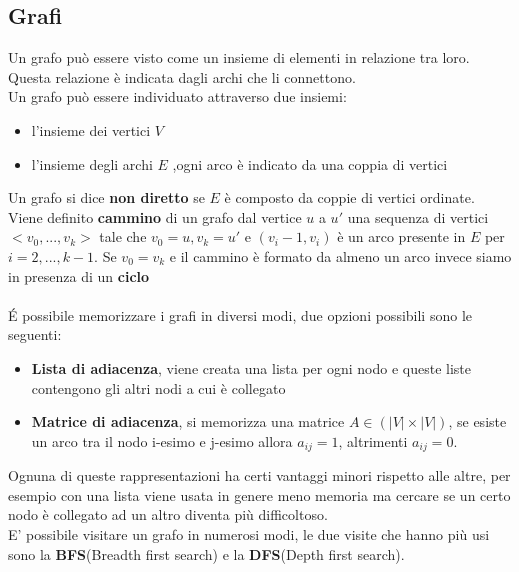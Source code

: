 \documentclass[]{article}
\begin{document}
\subsection{Grafi}
Un grafo può essere visto come un insieme di elementi in relazione tra loro.\\
Questa relazione è indicata dagli archi che li connettono.\\
Un grafo può essere individuato attraverso due insiemi:
\begin{itemize}
\item l'insieme dei vertici $V$
\item l'insieme degli archi $E$ ,ogni arco è indicato da una coppia di vertici
\end{itemize}
Un grafo si dice \textbf{non diretto} se $E$ è composto da coppie di vertici ordinate.\\
Viene definito \textbf{cammino} di un grafo dal vertice $u$ a $u'$ una sequenza di vertici $<v_0, ... , v_k>$ tale che $v_0 = u,v_k=u'$ e $(v_i-1, v_i)$ è un arco presente in $E$ per $i = 2,..., k-1$. Se $v_0 = v_k$ e il cammino è formato da almeno un arco invece siamo in presenza di un \textbf{ciclo}
\\\\
\'E possibile memorizzare i grafi in diversi modi, due opzioni possibili sono le seguenti:
\begin{itemize}
\item \textbf{Lista di adiacenza}, viene creata una lista per ogni nodo e queste liste contengono gli altri nodi a cui è collegato
\item \textbf{Matrice di adiacenza}, si memorizza una matrice $A \in (|V| \times |V|)$, se esiste un arco tra il nodo i-esimo e j-esimo allora $a_{ij} = 1$, altrimenti $a_{ij} = 0$. 
\end{itemize}
Ognuna di queste rappresentazioni ha certi vantaggi minori rispetto alle altre, per esempio con una lista viene usata in genere meno memoria ma cercare se un certo nodo è collegato ad un altro diventa più difficoltoso.\\ 
E' possibile visitare un grafo in numerosi modi, le due visite che hanno più usi sono la \textbf{BFS}(Breadth first search) e la \textbf{DFS}(Depth first search).\\
\end{document}
